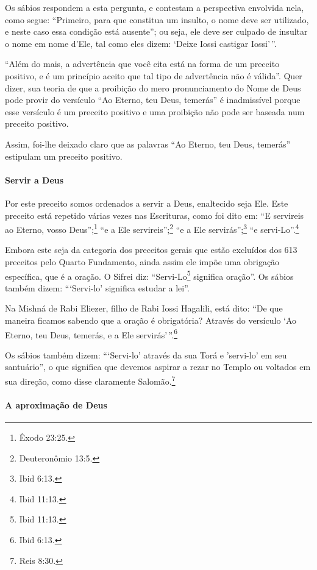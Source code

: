 Os sábios respondem a esta pergunta, e contestam a perspectiva envolvida
nela, como segue: ``Primeiro, para que constitua um insulto, o nome deve
ser utilizado, e neste caso essa condição está ausente''; ou seja, ele
deve ser culpado de insultar o nome em nome d'Ele, tal como eles dizem:
`Deixe Iossi castigar Iossi'\,''.

``Além do mais, a advertência que você cita está na forma de um preceito
positivo, e é um princípio aceito que tal tipo de advertência não é
válida''. Quer dizer, sua teoria de que a proibição do mero
pronunciamento do Nome de Deus pode provir do versículo ``Ao Eterno, teu
Deus, temerás'' é inadmissível porque esse versículo é um preceito
positivo e uma proibição não pode ser baseada num preceito positivo.

Assim, foi-lhe deixado claro que as palavras ``Ao Eterno, teu Deus,
temerás'' estipulam um preceito positivo.

\paragraph{Servir a Deus}

Por este preceito somos ordenados a servir a Deus, enaltecido seja Ele.
Este preceito está repetido várias vezes nas Escrituras, como foi dito
em: ``E servireis ao Eterno, vosso Deus'';\footnote{Êxodo 23:25.} ``e a Ele
servireis'';\footnote{Deuteronômio 13:5.} ``e a Ele servirás'';\footnote{Ibid 6:13.} ``e servi-Lo''.\footnote{Ibid 11:13.}

Embora este seja da categoria dos preceitos gerais que estão excluídos dos 613 preceitos pelo Quarto Fundamento, ainda assim ele impõe uma obrigação
específica, que é a oração. O Sifrei diz: ``Servi-Lo\footnote{Ibid 11:13.}
significa oração''. Os sábios também dizem: ```Servi-lo' significa
estudar a lei''.

Na Mishná de Rabi Eliezer, filho de Rabi Iossi Hagalili, está dito:
``De que maneira ficamos sabendo que a oração é obrigatória? Através do
versículo `Ao Eterno, teu Deus, temerás, e a Ele servirás'\,''.\footnote{Ibid
6:13.}

Os sábios também dizem: ```Servi-lo' através da sua Torá e
'servi-lo' em seu santuário'', o que significa que devemos aspirar a
rezar no Templo ou voltados em sua direção, como disse claramente
Salomão.\footnote{Reis 8:30.}

\paragraph{A aproximação de Deus}

